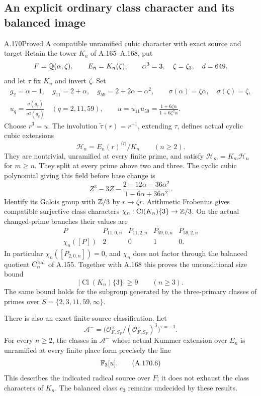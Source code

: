 \subsection{An explicit ordinary class character and its balanced image}

\begin{statement}{A.170}{Proved}
{A compatible unramified cubic character with exact source and target}
Retain the tower \(K_n\) of A.165--A.168, put
\[
 F=\mathbb Q(\alpha,\zeta),\qquad E_n=K_n(\zeta),\qquad
 \alpha^3=3,\quad \zeta=\zeta_3,\quad d=649,
\]
and let \(\tau\) fix \(K_n\) and invert \(\zeta\).
Set
\[
 \begin{gathered}
 g_2=\alpha-1,\quad g_{11}=2+\alpha,\quad
 g_{59}=2+2\alpha-\alpha^2,\qquad
 \sigma(\alpha)=\zeta\alpha,\quad\sigma(\zeta)=\zeta,\\
 u_q=\frac{\sigma(g_q)}{\sigma^2(g_q)}
       \quad(q=2,11,59),\qquad
 u=u_{11}u_{59}
      =\frac{1+6\zeta\alpha}{1+6\zeta^2\alpha}.
 \end{gathered}
\tag{A.170.1}
\]
Choose \(r^3=u\).  The involution
\(\widetilde\tau(r)=r^{-1}\), extending \(\tau\), defines actual
cyclic cubic extensions
\[
 \mathscr H_n=E_n(r)^{\langle\widetilde\tau\rangle}/K_n
                   \qquad(n\ge2).
\tag{A.170.2}
\]
They are nontrivial, unramified at every finite prime, and satisfy
\(\mathscr H_m=K_m\mathscr H_n\) for \(m\ge n\).
They split at every prime above two and three.
The cyclic cubic polynomial giving this field before base change is
\[
 Z^3-3Z-
     \frac{2-12\alpha-36\alpha^2}{1-6\alpha+36\alpha^2}.
\tag{A.170.3}
\]
Identify its Galois group with \(\mathbb Z/3\) by
\(r\mapsto\zeta r\).  Arithmetic Frobenius gives compatible
surjective class characters
\(\chi_n:\operatorname{Cl}(K_n)\{3\}\to\mathbb Z/3\).
On the actual changed-prime branches their values are
\[
 \begin{array}{c|rrrr}
 P&P_{11,0,n}&P_{11,2,n}&P_{59,0,n}&P_{59,2,n}\\ \hline
 \chi_n([P])&2&0&1&0 .
 \end{array}
\tag{A.170.4}
\]
In particular \(\chi_n([P_{2,0,n}])=0\), and \(\chi_n\) does not
factor through the balanced quotient \(C_n^{\rm bal}\) of A.155.
Together with A.168 this proves the unconditional size bound
\[
                 |\operatorname{Cl}(K_n)\{3\}|\ge9
                       \qquad(n\ge3).
\tag{A.170.5}
\]
The same bound holds for the subgroup generated by the three-primary
classes of primes over \(S=\{2,3,11,59,\infty\}\).

There is also an exact finite-source classification.  Let
\[
 \mathcal A^-=
  \bigl(\mathcal O_{F,S_F}^{\times}/
                    (\mathcal O_{F,S_F}^{\times})^3\bigr)^{\tau=-1}.
\]
For every \(n\ge2\), the classes in \(\mathcal A^-\) whose actual
Kummer extension over \(E_n\) is unramified at every finite place
form precisely the line
\[
                              \mathbb F_3[u].
\tag{A.170.6}
\]
This describes the indicated radical source over \(F\); it does not
exhaust the class characters of \(K_n\).
The balanced class \(e_3\) remains undecided by these results.
\end{statement}

